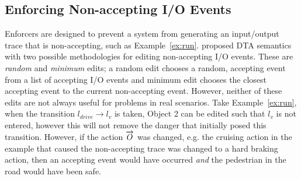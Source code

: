 \subsection{Enforcing Non-accepting I/O Events}
Enforcers are designed to prevent a system from generating an input/output trace that is non-accepting, such as Example~\ref{ex:run}.
\cite{recps} proposed \ac{DTA} semantics with two possible methodologies for editing non-accepting I/O events.
These are \textit{random} and \textit{minimum} edits; a random edit chooses a random, accepting event from a list of accepting I/O events and minimum edit chooses the closest accepting event to the current non-accepting event.
However, neither of these edits are not always useful for problems in real scenarios.
Take Example~\ref{ex:run}, when the transition $l_{drive} \rightarrow l_v$ is taken, Object 2 can be edited such that $l_v$ is not entered, however this will not remove the danger that initially posed this transition.
However, if the action $\overrightarrow{O}$ was changed, e.g. the cruising action in the example that caused the non-accepting trace was changed to a hard braking action, then an accepting event would have occurred \textit{and} the pedestrian in the road would have been safe.


